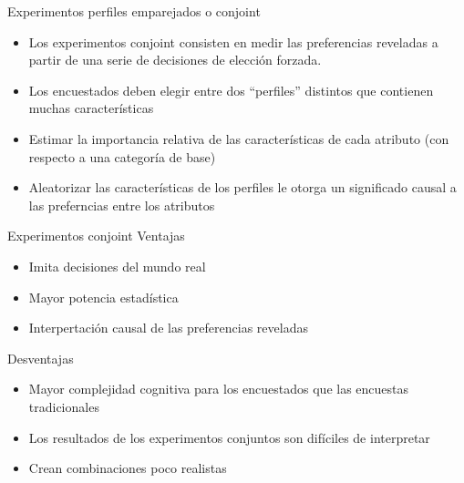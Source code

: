 \documentclass[
  ignorenonframetext,
]{beamer}
\providecommand{\tightlist}{%
  \setlength{\itemsep}{0pt}\setlength{\parskip}{0pt}}
\begin{document}
\begin{frame}{Experimentos perfiles emparejados o conjoint}
\protect\hypertarget{experimentos-perfiles-emparejados-o-conjoint}{}
\begin{itemize}
\tightlist
\item
  Los experimentos conjoint consisten en medir las preferencias
  reveladas a partir de una serie de decisiones de elección forzada.
\item
  Los encuestados deben elegir entre dos ``perfiles'' distintos que
  contienen muchas características
\item
  Estimar la importancia relativa de las características de cada
  atributo (con respecto a una categoría de base)
\item
  Aleatorizar las características de los perfiles le otorga un
  significado causal a las preferncias entre los atributos
\end{itemize}
\end{frame}

\begin{frame}{Experimentos conjoint}
\protect\hypertarget{experimentos-conjoint}{}
Ventajas

\begin{itemize}
\tightlist
\item
  Imita decisiones del mundo real
\item
  Mayor potencia estadística
\item
  Interpertación causal de las preferencias reveladas
\end{itemize}

Desventajas

\begin{itemize}
\tightlist
\item
  Mayor complejidad cognitiva para los encuestados que las encuestas
  tradicionales
\item
  Los resultados de los experimentos conjuntos son difíciles de
  interpretar
\item
  Crean combinaciones poco realistas
\end{itemize}
\end{frame}

\end{document}
